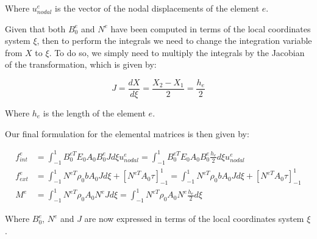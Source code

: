 Where $u_{nodal}^e$ is the vector of the nodal displacements of the element $e$.

Given that both $B_0^e$ and $N^e$ have been computed in terms of the local coordinates system $\xi$, then to perform the integrals we need to change the integration variable from $X$ to $\xi$.
To do so, we simply need to multiply the integrals by the Jacobian of the transformation, which is given by:

\begin{equation}
    J = \frac{dX}{d\xi} = \frac{X_2 - X_1}{2} = \frac{h_e}{2}
\end{equation}

Where $h_e$ is the length of the element $e$.

Our final formulation for the elemental matrices is then given by:

\begin{align}
    f_{int}^e & = \int_{-1}^{1} B_0^{eT} E_0 A_0 B_0^e J d\xi u_{nodal}^e = \int_{-1}^{1} B_0^{eT} E_0 A_0 B_0^e \frac{h_e}{2} d\xi u_{nodal}^e                                           \\
    f_{ext}^e & = \int_{-1}^{1} N^{eT} \rho_0 b A_0 J d\xi + \left[ N^{eT} A_0 \tau \right]_{-1}^{1} = \int_{-1}^{1} N^{eT} \rho_0 b A_0 J d\xi + \left[ N^{eT} A_0 \tau \right]_{-1}^{1} \\
    M^e       & = \int_{-1}^{1} N^{eT} \rho_0 A_0 N^e J d\xi = \int_{-1}^{1} N^{eT} \rho_0 A_0 N^e \frac{h_e}{2} d\xi
\end{align}

Where $B_0^e$, $N^e$ and $J$ are now expressed in terms of the local coordinates system $\xi$.